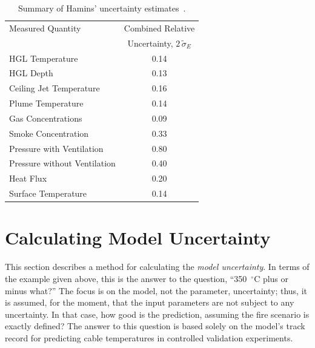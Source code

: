 \begin{table}[t]
\caption{Summary of Hamins' uncertainty estimates~\cite{NUREG_1824}. }
\begin{center}
\begin{tabular}{|l|c|}
\hline
Measured Quantity               & Combined Relative       \\
                                & Uncertainty, $2 \, \widetilde{\sigma}_E$       \\ \hline \hline
HGL Temperature                 & 0.14    \\ \hline
HGL Depth                       & 0.13    \\ \hline
Ceiling Jet Temperature         & 0.16    \\ \hline
Plume Temperature               & 0.14    \\ \hline
Gas Concentrations              & 0.09    \\ \hline
Smoke Concentration             & 0.33    \\ \hline
Pressure with Ventilation       & 0.80    \\ \hline
Pressure without Ventilation    & 0.40    \\ \hline
Heat Flux                       & 0.20    \\ \hline
Surface Temperature             & 0.14    \\ \hline
\end{tabular}
\end{center}
\label{Uncertainty}
\end{table}






\section{Calculating Model Uncertainty}

This section describes a method for calculating the {\em model uncertainty}. In terms of the example given above, this
is the answer to the question, ``350~$^\circ$C plus or minus what?'' The focus is on the model, not the parameter, uncertainty;
thus, it is assumed, for the moment, that the input parameters are not subject to any uncertainty.
In that case, how good is the prediction, assuming the fire scenario is exactly defined? The answer to this question is based solely on
the model's track record for predicting cable temperatures in controlled validation experiments.

